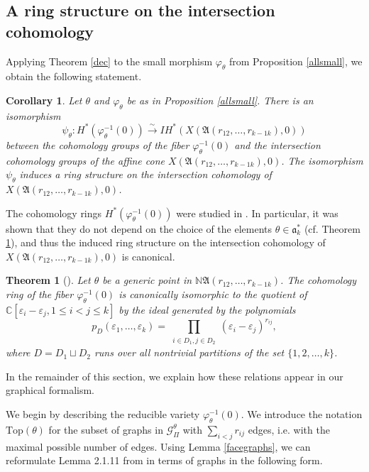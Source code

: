 \documentclass[11pt]{article}
\newtheorem{theorem}[theo]{Theorem}
\newtheorem{coro}[theo]{Corollary}
\theoremstyle{definition}
\numberwithin{equation}{section}
\newcommand{\A}{\mathfrak{A}}
\newcommand{\ak}{\mathfrak{a}_k}
\begin{document}
\subsection{A ring structure on the intersection cohomology}
Applying Theorem \ref{dec} to the small morphism $\varphi_\theta$ from 
Proposition \ref{allsmall}, we obtain the following statement.
\begin{coro}\label{psi}
	Let $\theta$ and $\varphi_\theta$ be as in Proposition \ref{allsmall}. 
	There is an isomorphism 
	$$\psi_\theta: H^*(\varphi_\theta^{-1}(0)) \xrightarrow{\sim} IH^*(X(\A(r_{12}, \ldots ,r_{k-1 
	k}),0))$$
	between the cohomology groups of the fiber $\varphi_\theta^{-1}(0)$ and the 
	intersection cohomology groups of the affine cone $X(\A(r_{12}, \ldots ,r_{k-1 
	k}),0)$.
	The isomorphism $\psi_\theta$ induces a ring structure on the intersection 
	cohomology of $X(\A(r_{12}, \ldots ,r_{k-1 k}),0)$.
	\end{coro}


The cohomology rings $H^*(\varphi_\theta^{-1}(0))$ were studied in \cite{HSt}. 
In particular, it was shown that they do not depend on the choice of the 
elements $\theta\in\ak^*$ (cf.  Theorem \ref{algrelations}), and thus the 
induced ring structure on the intersection cohomology of  
$X(\A(r_{12}, \ldots ,r_{k-1 k}),0)$ is canonical.

\begin{theorem}[{\cite[Theorem 8.3]{HSt}}]\label{algrelations}
	Let $\theta$ be a generic point in $\mathbb{N}\A(r_{12}, \ldots ,r_{k-1 k})$. 
	The cohomology ring of the fiber $\varphi_\theta^{-1}(0)$ is canonically 
	isomorphic to the quotient of 
	$\mathbb{C}[\varepsilon_i-\varepsilon_j, 1\leq i<j\leq k]$ by the ideal 
	generated by the polynomials 
\begin{equation}\label{HStrelations}
		p_{D}(\varepsilon_1,\dots,\varepsilon_k)=\prod_{\substack{i\in 
		D_1, j\in D_2}}(\varepsilon_i-\varepsilon_j)^{r_{ij}},
\end{equation} where $D=D_1\sqcup 
			D_2$ runs 
	over all nontrivial partitions of the set $\{1,2, \ldots ,k\}$. 
\end{theorem}

In the remainder of this section, we explain how these relations appear in our 
graphical formalism.

We begin by describing the reducible variety $\varphi_\theta^{-1}(0)$.  
We introduce the notation $\mathrm{Top}(\theta)$ for the subset of graphs in 
$\mathcal{G}^{\theta}_\Pi$ with $\sum_{i<j}r_{ij}$ edges, i.e.  with the maximal 
possible number of edges. Using Lemma 
\ref{facegraphs}, we can reformulate Lemma 2.1.11 from \cite{Yau} in terms of 
graphs in the following form.
\end{document}
